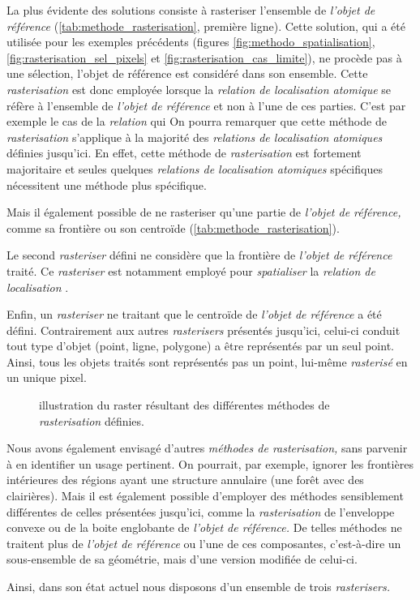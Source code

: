 
La plus évidente des solutions consiste à rasteriser l'ensemble de
\emph{l'objet de référence} (\autoref{tab:methode_rasterisation},
première ligne). Cette solution, qui a été utilisée pour les exemples
précédents (\ie figures \ref{fig:methodo_spatialisation},
\ref{fig:rasterisation_sel_pixels} et
\ref{fig:rasterisation_cas_limite}), ne procède pas à une sélection,
l'objet de référence est considéré dans son ensemble.
%
Cette \emph{rasterisation} est donc employée lorsque la \emph{relation
  de localisation atomique} se réfère à l'ensemble de \emph{l'objet de
  référence} et non à l'une de ces parties. C'est par exemple le cas
de la \emph{relation}  qui
%
On pourra remarquer que cette méthode de \emph{rasterisation}
s'applique à la majorité des \emph{relations de localisation
  atomiques} définies jusqu'ici. En effet, cette méthode de
\emph{rasterisation} est fortement majoritaire et seules quelques
\emph{relations de localisation atomiques} spécifiques nécessitent une
méthode plus spécifique.

Mais il également possible de ne rasteriser qu'une partie de
\emph{l'objet de référence,} comme sa frontière ou son centroïde
(\autoref{tab:methode_rasterisation}).

Le second \emph{rasteriser} défini ne considère que la frontière de
\emph{l'objet de référence} traité.
%
Ce \emph{rasteriser} est notamment employé pour \emph{spatialiser} la
\emph{relation de localisation} .

Enfin, un \emph{rasteriser} ne traitant que le centroïde de
\emph{l'objet de référence} a été défini. Contrairement aux autres
\emph{rasterisers} présentés jusqu'ici, celui-ci conduit tout type
d'objet (\ie point, ligne, polygone) a être représentés par un seul
point. Ainsi, tous les objets traités sont représentés pas un point,
lui-même \emph{rasterisé} en un unique pixel.

\begin{figure}
  \centering
  
  \caption{illustration du raster résultant des différentes méthodes
    de \emph{rasterisation} définies.}
  \label{fig:methode_rasterisation}
\end{figure}

Nous avons également envisagé d'autres \emph{méthodes de
  rasterisation,} sans parvenir à en identifier un usage pertinent. On
pourrait, par exemple, ignorer les frontières intérieures des régions
ayant une structure annulaire (\eg une forêt avec des
clairières). Mais il est également possible d'employer des méthodes
sensiblement différentes de celles présentées jusqu'ici, comme la
\emph{rasterisation} de l'enveloppe convexe ou de la boite englobante
de \emph{l'objet de référence.} De telles méthodes ne traitent plus de
\emph{l'objet de référence} ou l'une de ces composantes, c'est-à-dire
un sous-ensemble de sa géométrie, mais d'une version modifiée de
celui-ci.

Ainsi, dans son état actuel nous disposons d'un ensemble de trois
\emph{rasterisers.}

